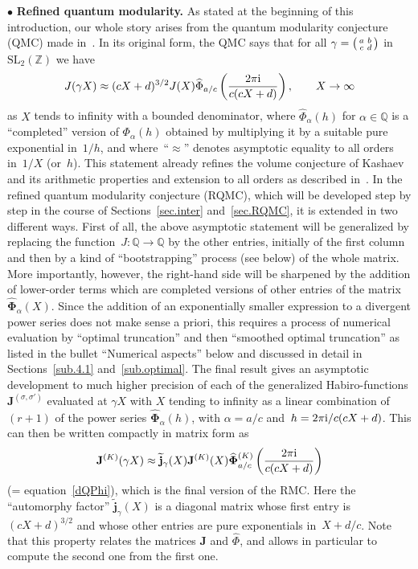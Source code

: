 \documentclass[pdftex]{sigma}
\numberwithin{equation}{section}
\def\BZ{\mathbb Z}
\def\l{\lambda}
\def\wt{\widetilde}
\def\SL{\mathrm{SL}}
\def\Phih{\widehat\Phi}
\def\a{\alpha}
\def\l{\lambda}
\def\Q{\mathbb Q}
\def\a{\alpha}
\def\l{\lambda}
\def\s{\sigma}
\def\sma#1#2#3#4{\bigl(\smallmatrix#1&#2\\#3&#4\endsmallmatrix\bigr)} %
\def\g{\gamma}
\def\bJ{J} \def\bJ{\mathbf{J}}
\def\bPhih{\mathbf{\Phih}}
\def\jp{\mathbf{j}}
\def\jt{\jp_\l} %
\def\jt{\jp_{\text{tw}}} %
\def\jt{\jp_{\textsf T}} %
\def\jt{\jp^{(\l)}}
\def\jt{\jp^{(\l)}}
\def\jt{\wt{\jp}}
\begin{document}
$\bullet$ {\bf Refined quantum modularity.}
As stated at the beginning of
this introduction, our whole story arises from the quantum modularity conjecture (QMC)
made in~\cite{Za:QMF}. In its original form, the QMC says that for all
$\gamma=\sma abcd$ in $\SL_2(\BZ)$ we have
\[
J(\g X) \approx (cX+d)^{3/2} J(X)
\Phih_{a/c}\left(\frac{2\pi {\rm i}}{c(cX+d)}\right), \qquad X\to\infty
\]
as $X$ tends to infinity with a bounded denominator, where $\Phih_\a(h)$ for $\a\in\Q$
is a ``completed'' version of $\Phi_\a(h)$ obtained by multiplying it by a suitable pure
exponential in~$1/h$, and where~``$\approx$'' denotes asymptotic equality to all orders
in~$1/X$ (or~$h$). This statement already refines the volume conjecture of
Kashaev~\cite{K95} and its arithmetic properties and extension to all orders as
described in~\cite{DGLZ}. In the refined quantum modularity conjecture (RQMC), which
will be developed step by step in the course of Sections~\ref{sec.inter}
and~\ref{sec.RQMC}, it is extended in two different ways. First of all, the above
asymptotic statement will be generalized by replacing the function~${J\colon\Q\to\Q}$ by the
other entries, initially of the first column and then by a kind of ``bootstrapping''
process (see below) of the whole matrix. More importantly, however, the right-hand
side will be sharpened by the addition of lower-order terms which are completed
versions of other entries of the matrix~$\bPhih_\a(X)$. Since the addition of an
exponentially smaller expression to a divergent power series does not make sense
a priori, this requires a process of numerical evaluation by ``optimal truncation'' and
then ``smoothed optimal truncation'' as listed in the bullet ``Numerical aspects'' below
and discussed in detail in Sections~\ref{sub.4.1} and~\ref{sub.optimal}. The final
result gives an asymptotic development to much higher precision of each of the
generalized Habiro-functions $\bJ^{(\s,\s')}$ evaluated at $\g X$ with $X$ tending to
infinity as a linear combination of $(r+1)$ of the power series $\bPhih_\a(h)$, with
$\a=a/c$ and~$h=2\pi {\rm i}/c(cX+d)$. This can then be written compactly in matrix form as
\[
\bJ^{(K)}(\g X)
 \approx \jt_\g(X) \bJ^{(K)}(X)
 \bPhih^{(K)}_{a/c}\left(\frac{2\pi {\rm i}}{c(cX+d)}\right)
\]
(= equation~\eqref{dQPhi}), which is the final version of the RMC. Here the
``automorphy factor'' $\jt_\g(X)$ is a diagonal matrix whose first entry is
$(cX+d)^{3/2}$ and whose other entries are pure exponentials in~$X+d/c$. Note that this
property relates the matrices $\bJ$ and $\Phih$, and allows in particular to compute
the second one from the first one.
\end{document}
